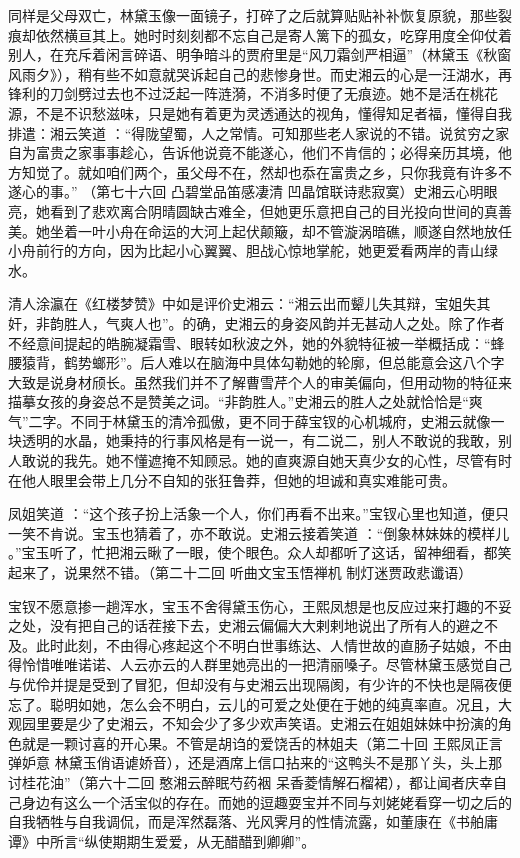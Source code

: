\documentclass[openany,scheme = chinese, linespread = 1.5]{ctexbook}
\begin{document}
同样是父母双亡，林黛玉像一面镜子，打碎了之后就算贴贴补补恢复原貌，那些裂痕却依然横亘其上。她时时刻刻都不忘自己是寄人篱下的孤女，吃穿用度全仰仗着别人，在充斥着闲言碎语、明争暗斗的贾府里是“风刀霜剑严相逼”（林黛玉《秋窗风雨夕》），稍有些不如意就哭诉起自己的悲惨身世。而史湘云的心是一汪湖水，再锋利的刀剑劈过去也不过泛起一阵涟漪，不消多时便了无痕迹。她不是活在桃花源，不是不识愁滋味，只是她有着更为灵透通达的视角，懂得知足者福，懂得自我排遣：湘云笑道 ：“得陇望蜀，人之常情。可知那些老人家说的不错。说贫穷之家自为富贵之家事事趁心，告诉他说竟不能遂心，他们不肯信的；必得亲历其境，他方知觉了。就如咱们两个，虽父母不在，然却也忝在富贵之乡，只你我竟有许多不遂心的事。” （第七十六回 凸碧堂品笛感凄清 凹晶馆联诗悲寂寞）史湘云心明眼亮，她看到了悲欢离合阴晴圆缺古难全，但她更乐意把自己的目光投向世间的真善美。她坐着一叶小舟在命运的大河上起伏颠簸，却不管漩涡暗礁，顺遂自然地放任小舟前行的方向，因为比起小心翼翼、胆战心惊地掌舵，她更爱看两岸的青山绿水。

清人涂瀛在《红楼梦赞》中如是评价史湘云：“湘云出而颦儿失其辩，宝姐失其奸，非韵胜人，气爽人也”。的确，史湘云的身姿风韵并无甚动人之处。除了作者不经意间提起的皓腕凝霜雪、眼转如秋波之外，她的外貌特征被一举概括成：“蜂腰猿背，鹤势螂形”。后人难以在脑海中具体勾勒她的轮廓，但总能意会这八个字大致是说身材颀长。虽然我们并不了解曹雪芹个人的审美偏向，但用动物的特征来描摹女孩的身姿总不是赞美之词。“非韵胜人。”史湘云的胜人之处就恰恰是“爽气”二字。不同于林黛玉的清冷孤傲，更不同于薛宝钗的心机城府，史湘云就像一块透明的水晶，她秉持的行事风格是有一说一，有二说二，别人不敢说的我敢，别人敢说的我先。她不懂遮掩不知顾忌。她的直爽源自她天真少女的心性，尽管有时在他人眼里会带上几分不自知的张狂鲁莽，但她的坦诚和真实难能可贵。

凤姐笑道 ：“这个孩子扮上活象一个人，你们再看不出来。”宝钗心里也知道，便只一笑不肯说。宝玉也猜着了，亦不敢说。史湘云接着笑道 ：“倒象林妹妹的模样儿 。”宝玉听了，忙把湘云瞅了一眼，使个眼色。众人却都听了这话，留神细看，都笑起来了，说果然不错。（第二十二回 听曲文宝玉悟禅机 制灯迷贾政悲谶语）

宝钗不愿意掺一趟浑水，宝玉不舍得黛玉伤心，王熙凤想是也反应过来打趣的不妥之处，没有把自己的话茬接下去，史湘云偏偏大大剌剌地说出了所有人的避之不及。此时此刻，不由得心疼起这个不明白世事练达、人情世故的直肠子姑娘，不由得怜惜唯唯诺诺、人云亦云的人群里她亮出的一把清丽嗓子。尽管林黛玉感觉自己与优伶并提是受到了冒犯，但却没有与史湘云出现隔阂，有少许的不快也是隔夜便忘了。聪明如她，怎么会不明白，云儿的可爱之处便在于她的纯真率直。况且，大观园里要是少了史湘云，不知会少了多少欢声笑语。史湘云在姐姐妹妹中扮演的角色就是一颗讨喜的开心果。不管是胡诌的爱饶舌的林姐夫（第二十回 王熙凤正言弹妒意 林黛玉俏语谑娇音），还是酒席上信口拈来的“这鸭头不是那丫头，头上那讨桂花油”（第六十二回 憨湘云醉眠芍药裀 呆香菱情解石榴裙），都让闻者庆幸自己身边有这么一个活宝似的存在。而她的逗趣耍宝并不同与刘姥姥看穿一切之后的自我牺牲与自我调侃，而是浑然磊落、光风霁月的性情流露，如董康在《书舶庸谭》中所言“纵使期期生爱爱，从无醋醋到卿卿”。
\end{document}
